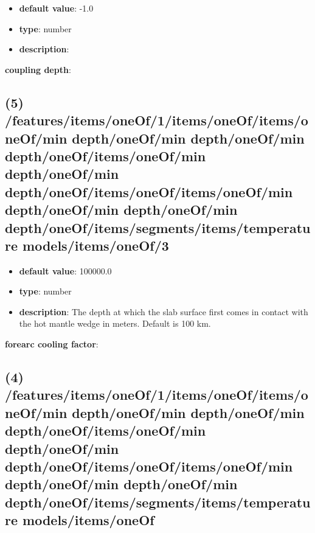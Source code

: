 \begin{itemize}[leftmargin=9em]\item {\bf default value}: -1.0
\item {\bf type}: number
\item {\bf description}: 
\end{itemize}\item {\bf coupling depth}: \subsection{(5) /features/items/oneOf/1/items/oneOf/items/oneOf/min depth/oneOf/min depth/oneOf/min depth/oneOf/items/oneOf/min depth/oneOf/min depth/oneOf/items/oneOf/items/oneOf/min depth/oneOf/min depth/oneOf/min depth/oneOf/items/segments/items/temperature models/items/oneOf/3}
\begin{itemize}[leftmargin=5em]\item {\bf default value}: 100000.0
\item {\bf type}: number
\item {\bf description}: The depth at which the slab surface first comes in contact with the hot mantle wedge in meters. Default is 100 km.
\end{itemize}\item {\bf forearc cooling factor}: \subsection{(4) /features/items/oneOf/1/items/oneOf/items/oneOf/min depth/oneOf/min depth/oneOf/min depth/oneOf/items/oneOf/min depth/oneOf/min depth/oneOf/items/oneOf/items/oneOf/min depth/oneOf/min depth/oneOf/min depth/oneOf/items/segments/items/temperature models/items/oneOf}

